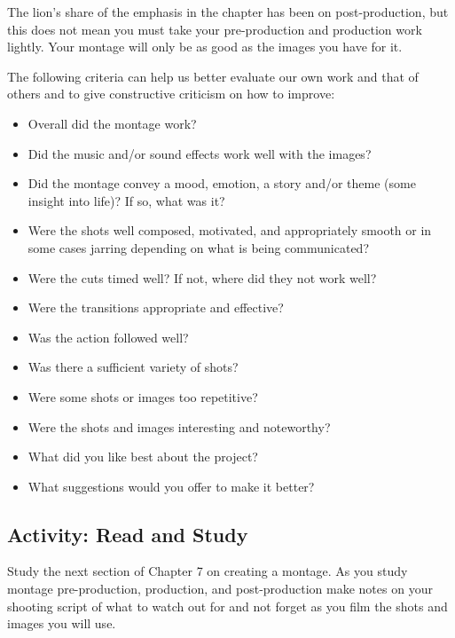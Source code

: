 \documentclass[
]{book}
\providecommand{\tightlist}{%
  \setlength{\itemsep}{0pt}\setlength{\parskip}{0pt}}
\begin{document}
The lion's share of the emphasis in the chapter has been on post-production, but this does not mean you must take your pre-production and production work lightly. Your montage will only be as good as the images you have for it.

The following criteria can help us better evaluate our own work and that of others and to give constructive criticism on how to improve:

\begin{itemize}
\tightlist
\item
  Overall did the montage work?
\item
  Did the music and/or sound effects work well with the images?
\item
  Did the montage convey a mood, emotion, a story and/or theme (some insight into life)? If so, what was it?
\item
  Were the shots well composed, motivated, and appropriately smooth or in some cases jarring depending on what is being communicated?
\item
  Were the cuts timed well? If not, where did they not work well?
\item
  Were the transitions appropriate and effective?
\item
  Was the action followed well?
\item
  Was there a sufficient variety of shots?
\item
  Were some shots or images too repetitive?
\item
  Were the shots and images interesting and noteworthy?
\item
  What did you like best about the project?
\item
  What suggestions would you offer to make it better?
\end{itemize}

\hypertarget{activity-read-and-study-3}{%
\subsection*{Activity: Read and Study}\label{activity-read-and-study-3}}

\begin{reflect}
Study the next section of Chapter 7 on creating a montage. As you study montage pre-production, production, and post-production make notes on your shooting script of what to watch out for and not forget as you film the shots and images you will use.
\end{reflect}
\end{document}
